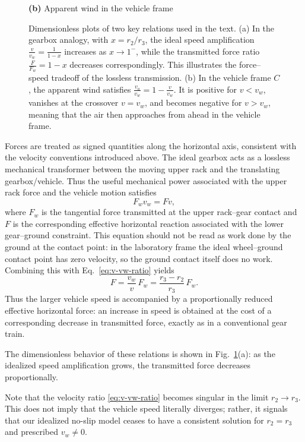 \documentclass[a4paper]{article}
\begin{document}
\begin{figure}[t]
\begin{minipage}{0.48\textwidth}
\vspace{1mm}
\textbf{(b)} Apparent wind in the vehicle frame
\end{minipage}

\caption{Dimensionless plots of two key relations used in the text.
(a) In the gearbox analogy, with $x=r_2/r_3$, the ideal speed amplification
$\frac{v}{v_w}=\frac{1}{1-x}$ increases as $x\to1^{-}$, while the transmitted
force ratio $\frac{F}{F_w}=1-x$ decreases correspondingly. This illustrates
the force--speed tradeoff of the lossless transmission.
(b) In the vehicle frame \(C\), the apparent wind satisfies
$\frac{v_a}{v_w}=1-\frac{v}{v_w}$. It is positive for $v<v_w$, vanishes at the
crossover $v=v_w$, and becomes negative for $v>v_w$, meaning that the air then
approaches from ahead in the vehicle frame.}
\label{fig:dimensionless_plots}
\end{figure}

Forces are treated as signed quantities along the horizontal axis,
consistent with the velocity conventions introduced above.  The ideal gearbox
acts as a lossless mechanical transformer between the moving upper rack and
the translating gearbox/vehicle.  Thus the useful mechanical power associated
with the upper rack force and the vehicle motion satisfies
\[
F_w v_w = F v ,
\]
where \(F_w\) is the tangential force transmitted at the upper rack--gear
contact and \(F\) is the corresponding effective horizontal reaction associated
with the lower gear--ground constraint.  This equation should not be read as
work done by the ground at the contact point: in the laboratory frame the
ideal wheel--ground contact point has zero velocity, so the ground contact
itself does no work.
Combining this with Eq.~\eqref{eq:v-vw-ratio} yields
\begin{equation}
F = \frac{v_w}{v} \,  F_w
    = \frac{r_3 - r_2}{r_3}\, F_w.
\end{equation}
Thus the larger vehicle speed is accompanied by a proportionally reduced
effective horizontal force: an increase in speed is obtained at the cost of a
corresponding decrease in transmitted force, exactly as in a conventional gear
train.

The dimensionless behavior of these relations is shown in Fig.~\ref{fig:dimensionless_plots}(a): as the idealized speed amplification grows, the transmitted force decreases proportionally.

Note that the velocity ratio \eqref{eq:v-vw-ratio}
becomes singular in the limit $r_2 \to r_3$. This does not imply that the
vehicle speed literally diverges; rather, it signals that our idealized
no-slip model ceases to have a consistent solution for $r_2 = r_3$ and
prescribed $v_w \neq 0$.
\end{document}
